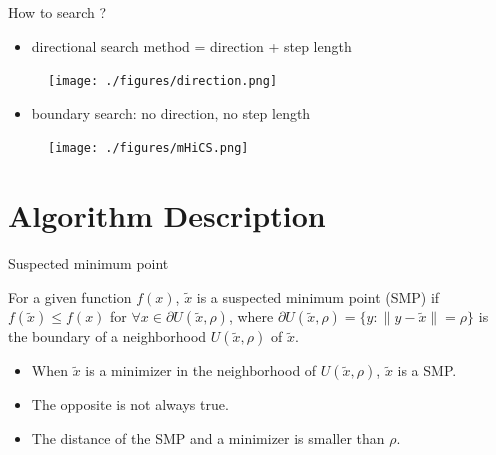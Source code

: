 \documentclass{beamer}
\begin{document}
\begin{frame}{How to search ? }

\begin{itemize}
	\item directional search method =  direction + step length 
\end{itemize}
\begin{figure}[!htbp]
	\centering
	  \texttt{[image: ./figures/direction.png]}
\end{figure}
\pause
\begin{itemize}
	\item boundary search: no direction, no step length
\end{itemize}
\begin{figure}[!htbp]
	\centering
	  \texttt{[image: ./figures/mHiCS.png]}
\end{figure}
\end{frame}

\section{Algorithm Description}
\begin{frame}{Suspected minimum point}
	
\begin{definition}
	For a given function $f(x)$,
	$\tilde{x}$ is a suspected minimum point (SMP) if $f(\tilde
	x)\leq f(x)$ for $\forall x\in \partial U(\tilde{x},\rho)$,
	where $\partial U(\tilde{x},\rho) = \{y: \|y-\tilde{x}\|=\rho \}$ is the boundary of
	a neighborhood $U(\tilde{x}, \rho)$ of $\tilde{x}$.
\end{definition}

\begin{itemize}
	\item When $\tilde{x}$ is a minimizer in the neighborhood of
		$U(\tilde{x}, \rho)$, $\tilde{x}$ is a SMP.
	\item The opposite is not always true.
	\item The distance of the SMP and a minimizer is smaller than $\rho$.
\end{itemize}
\end{frame}
\end{document}
